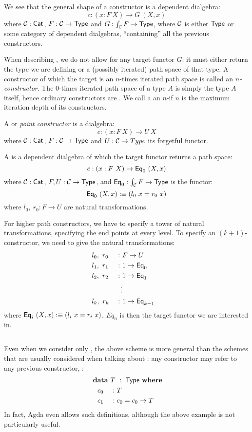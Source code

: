 \documentclass[a4paper,10pt]{article}
\begin{document}
We see that the general shape of a constructor is a dependent dialgebra:
$$
c : (x : F\ X) \to G\ (X , x)
$$
where $\mathcal{C} : \mathsf{Cat}$, $F : \mathcal{C} \to \mathsf{Type}$ and
$G : \int_{\mathcal{C}} F \to \mathsf{Type}$, where $\mathcal{C}$ is either $\mathsf{Type}$ or some
category of dependent dialgebras, ``containing'' all the previous
constructors.

When describing \hits, we do not allow for any target functor $G$: it
must either return the type we are defining or a (possibly iterated)
path space of that type. A constructor of which the target is an
$n$-times iterated path space is called an \emph{$n$-constructor}. The
$0$-times iterated path space of a type $A$ is simply the type $A$
itself, hence ordinary constructors are \zeroconstructors. We call a
\hit an $n$-\hit if $n$ is the maximum iteration depth of its
constructors.

A \emph{\zeroconstructor} or \emph{point constructor} is a dialgebra:
$$
c : (x : F\ X) \to U\ X
$$
where $\mathcal{C} : \mathsf{Cat}$, $F : \mathcal{C} \to \mathsf{Type}$ and $U : \mathcal{C} \to Type$ its forgetful
functor.

A \emph{\oneconstructor} is a dependent dialgebra of which the target
functor returns a path space:
$$
  c : (x : F\ X) \to \mathsf{Eq}_0\ (X, x)
$$
where $\mathcal{C} : \mathsf{Cat}$, $F, U : \mathcal{C} \to \mathsf{Type}$, and $\mathsf{Eq}_0 : \int_{\mathcal{C}} F \to
\mathsf{Type}$ is the functor:
$$
  \mathsf{Eq}_0\ (X , x) :\equiv (l_0\ x = r_0\ x)
$$
where $l_0,\ r_0 : F \to U$ are natural transformations.

For higher path constructors, we have to specify a tower of natural
transformations, specifying the end points at every level. To specify
an $(k+1)$-constructor, we need to give the natural transformations:
%
\begin{alignat*}{5}
  &l_0,\ r_0  &\ :\ &F \to U& \\
  &l_1,\ r_1  &\ : \ &1 \to \mathsf{Eq}_0& \\
  &l_2,\ r_2  &\ : \ &1 \to \mathsf{Eq}_1& \\
  &           &\vdots&& \\
  &l_k,\ r_k  &\ : \ &1 \to \mathsf{Eq}_{k-1}&
\end{alignat*}
%
where $\mathsf{Eq}_i\ (X, x) :\equiv (l_i\ x = r_i\ x)$. $Eq_n$ is then the target
functor we are interested in.

\subsection{}
\label{sec:zerohits}

Even when we consider only \zeroconstructors, the above scheme is more
general than the schemes that are usually considered when talking
about \oits: any constructor may refer to any previous
constructor, \eg:
%
\begin{alignat*}{5}
  &\rlap{$\data\ T\ :\ \Type\ \where$} \\
  &\ \ c_0 &\ :\ &T&\\
  &\ \ c_1 &\ :\ &c_0 = c_0 \to T&
\end{alignat*}
%
In fact, Agda even allows such definitions, although the above example
is not particularly useful.
\end{document}
